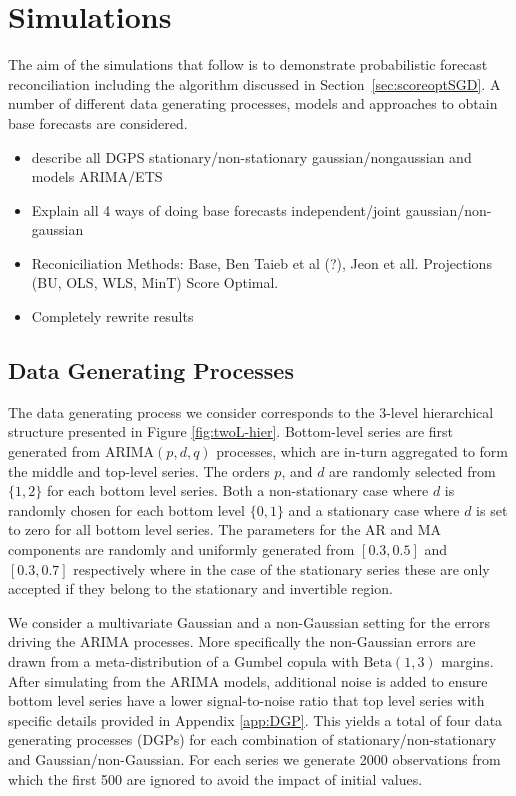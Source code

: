 \documentclass[12pt]{article}
\theoremstyle{definition}
\begin{document}
\section{Simulations}\label{sec:simulations}

The aim of the simulations that follow is to demonstrate probabilistic forecast reconciliation including the algorithm discussed in Section~\ref{sec:scoreoptSGD}.  A number of different data generating processes, models and approaches to obtain base forecasts are considered. 

\begin{itemize}
	\item describe all DGPS stationary/non-stationary gaussian/nongaussian and models ARIMA/ETS
	
	\item Explain all 4 ways of doing base forecasts independent/joint gaussian/non-gaussian
	
	\item Reconiciliation Methods: Base, Ben Taieb et al (?), Jeon et all. Projections (BU, OLS, WLS, MinT) Score Optimal.
	
	\item Completely rewrite results
\end{itemize}

\subsection{Data Generating Processes}\label{sec:dgp}

The data generating process we consider corresponds to the 3-level hierarchical structure presented in Figure \ref{fig:twoL-hier}. Bottom-level series are first generated from ARIMA$(p,d,q)$ processes, which are in-turn aggregated to form the middle and top-level series. The orders $p$, and $d$ are randomly selected from $\{1,2\}$ for each bottom level series. Both a non-stationary case where $d$ is randomly chosen for each bottom level $\{0,1\}$ and a stationary case where $d$ is set to zero for all bottom level series.  The parameters for the AR and MA components are randomly and uniformly generated from $[0.3,0.5]$ and $[0.3,0.7]$ respectively where in the case of the stationary series these are only accepted if they belong to the stationary and invertible region.

We consider a multivariate Gaussian and a non-Gaussian setting for the errors driving the ARIMA processes. More specifically the non-Gaussian errors are drawn from a meta-distribution of a Gumbel copula with $\textrm{Beta}(1,3)$ margins. After simulating from the ARIMA models, additional noise is added to ensure bottom level series have a lower signal-to-noise ratio that top level series with specific details provided in Appendix \ref{app:DGP}.  This yields a total of four data generating processes (DGPs) for each combination of stationary/non-stationary and Gaussian/non-Gaussian.  For each series we generate 2000 observations from which the first 500 are ignored to avoid the impact of initial values. 
\end{document}
